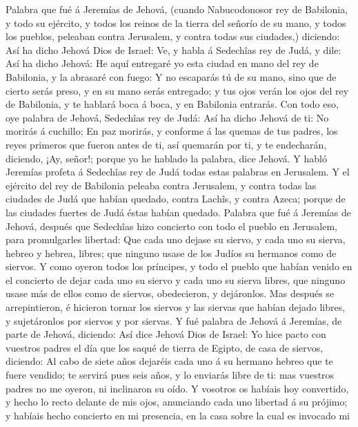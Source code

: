  Palabra que fué á Jeremías de Jehová, (cuando Nabucodonosor
rey de Babilonia, y todo su ejército, y todos los reinos de la tierra
del señorío de su mano, y todos los pueblos, peleaban contra Jerusalem,
y contra todas sus ciudades,) diciendo:  Así ha dicho Jehová
Dios de Israel: Ve, y habla á Sedechîas rey de Judá, y dile: Así ha
dicho Jehová: He aquí entregaré yo esta ciudad en mano del rey de
Babilonia, y la abrasaré con fuego:  Y no escaparás tú de su
mano, sino que de cierto serás preso, y en su mano serás entregado; y
tus ojos verán los ojos del rey de Babilonia, y te hablará boca á boca,
y en Babilonia entrarás.  Con todo eso, oye palabra de
Jehová, Sedechîas rey de Judá: Así ha dicho Jehová de ti: No morirás á
cuchillo;  En paz morirás, y conforme á las quemas de tus
padres, los reyes primeros que fueron antes de ti, así quemarán por ti,
y te endecharán, diciendo, ¡Ay, señor!; porque yo he hablado la palabra,
dice Jehová.  Y habló Jeremías profeta á Sedechîas rey de
Judá todas estas palabras en Jerusalem.  Y el ejército del
rey de Babilonia peleaba contra Jerusalem, y contra todas las ciudades
de Judá que habían quedado, contra Lachîs, y contra Azeca; porque de las
ciudades fuertes de Judá éstas habían quedado.  Palabra que
fué á Jeremías de Jehová, después que Sedechîas hizo concierto con todo
el pueblo en Jerusalem, para promulgarles libertad:  Que
cada uno dejase su siervo, y cada uno su sierva, hebreo y hebrea,
libres; que ninguno usase de los Judíos su hermanos como de siervos.
 Y como oyeron todos los príncipes, y todo el pueblo que
habían venido en el concierto de dejar cada uno su siervo y cada uno su
sierva libres, que ninguno usase más de ellos como de siervos,
obedecieron, y dejáronlos.  Mas después se arrepintieron, é
hicieron tornar los siervos y las siervas que habían dejado libres, y
sujetáronlos por siervos y por siervas.  Y fué palabra de
Jehová á Jeremías, de parte de Jehová, diciendo:  Así dice
Jehová Dios de Israel: Yo hice pacto con vuestros padres el día que los
saqué de tierra de Egipto, de casa de siervos, diciendo: 
Al cabo de siete años dejaréis cada uno á su hermano hebreo que te fuere
vendido; te servirá pues seis años, y lo enviarás libre de ti: mas
vuestros padres no me oyeron, ni inclinaron su oído.  Y
vosotros os habíais hoy convertido, y hecho lo recto delante de mis
ojos, anunciando cada uno libertad á su prójimo; y habíais hecho
concierto en mi presencia, en la casa sobre la cual es invocado mi
